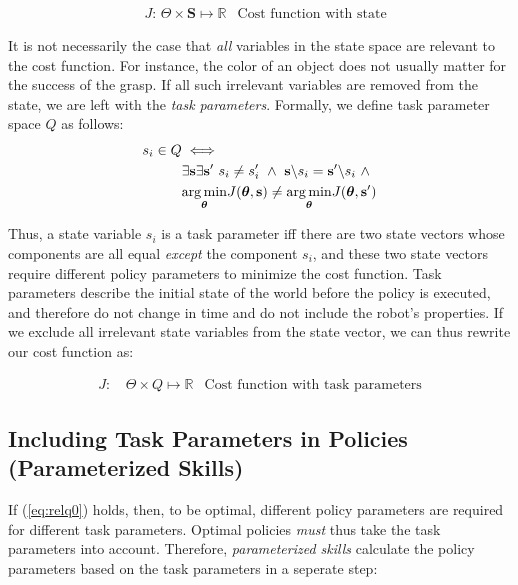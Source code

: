 \documentclass[12pt]{article}
\newcommand{\mymath}[1]{\ensuremath{#1}\xspace}
\newcommand{\pol}    {\mymath{\pi}}
\newcommand{\act}    {\mymath{\mathbf{a}}}
\newcommand{\actsp}  {\mymath{\mathbf{A}}}
\newcommand{\sta}    {\mymath{\mathbf{s}}}
\newcommand{\stasp}  {\mymath{\mathbf{S}}}
\newcommand{\app}    {\mymath{\bm{\theta}}}
\newcommand{\appsp}  {\mymath{\Theta}}
\newcommand{\taskp}  {\mymath{\mathbf{q}}}
\newcommand{\taskpsp}{\mymath{Q}}
\newcommand{\costf}  {\mymath{J}}
\DeclareMathOperator*{\argmin}{arg\,min}
\newcommand{\argminvar}[1]{\ensuremath{\underset{#1}{{\argmin}}}}
\begin{document}
\begin{align}
& \costf\mbox{: } \appsp \times \stasp \mapsto \mathbb{R}&\mbox{Cost function with state}\label{eq:cost_state}
\end{align}

It is not necessarily the case that \emph{all} variables in the state space are relevant to the cost function. For instance, the color of an object does not usually matter for the success of the grasp. If all such irrelevant variables are removed from the state, we are left with the \emph{task parameters}. Formally, we define task parameter space \taskpsp as follows:
%
\begin{align}
s_i \in \taskpsp &\iff\notag\\
&\exists \sta \exists \sta' ~s_i\neq s'_i ~\wedge~\sta\backslash s_i= \sta'\backslash s_i ~\wedge~\notag\\
&\argminvar{\app}\costf(\app,\sta) \neq \argminvar{\app}\costf(\app,\sta')\label{eq:relq0} 
\end{align}

Thus, a state variable $s_i$ is a task parameter iff there are two state vectors whose components are all equal \emph{except} the component $s_i$, and these two state vectors require different policy parameters to minimize the cost function. Task parameters describe the initial state of the world before the policy is executed, and therefore do not change in time and do not include the robot's properties. If we exclude all irrelevant state variables from the state vector, we can thus rewrite our cost function as:

\begin{align}
\costf\mbox{: } &\label{eq:cost_task} \appsp \times \taskpsp \mapsto \mathbb{R}&\mbox{Cost function with task parameters}
\end{align}

\subsection{Including Task Parameters in Policies (Parameterized Skills)}

If (\ref{eq:relq0}) holds, then, to be optimal, different policy parameters are required for different task parameters. Optimal policies \emph{must} thus take the task parameters into account. 
Therefore, \emph{parameterized skills} calculate the policy parameters based on the task parameters in a seperate step:
%
%
\end{document}
